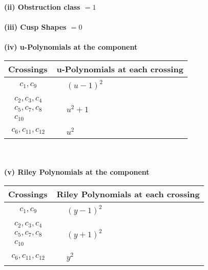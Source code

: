 \documentclass[1p]{elsarticle_modified}
\theoremstyle{definition}
\begin{document}
\flushleft \textbf{(ii) Obstruction class $= 1$}\\~\\
\flushleft \textbf{(iii) Cusp Shapes $= 0$}\\~\\
\newpage\renewcommand{\arraystretch}{1}
\flushleft \textbf{(iv) u-Polynomials at the component}\newline \\
\begin{tabular}{m{50pt}|m{274pt}}
Crossings & \hspace{64pt}u-Polynomials at each crossing \\
\hline $$\begin{aligned}c_{1},c_{9}\end{aligned}$$&$\begin{aligned}
&(u-1)^2
\end{aligned}$\\
\hline $$\begin{aligned}c_{2},c_{3},c_{4}\\c_{5},c_{7},c_{8}\\c_{10}\end{aligned}$$&$\begin{aligned}
&u^2+1
\end{aligned}$\\
\hline $$\begin{aligned}c_{6},c_{11},c_{12}\end{aligned}$$&$\begin{aligned}
&u^2
\end{aligned}$\\
\hline
\end{tabular}\\~\\
\newpage\renewcommand{\arraystretch}{1}
\flushleft \textbf{(v) Riley Polynomials at the component}\newline \\
\begin{tabular}{m{50pt}|m{274pt}}
Crossings & \hspace{64pt}Riley Polynomials at each crossing \\
\hline $$\begin{aligned}c_{1},c_{9}\end{aligned}$$&$\begin{aligned}
&(y-1)^2
\end{aligned}$\\
\hline $$\begin{aligned}c_{2},c_{3},c_{4}\\c_{5},c_{7},c_{8}\\c_{10}\end{aligned}$$&$\begin{aligned}
&(y+1)^2
\end{aligned}$\\
\hline $$\begin{aligned}c_{6},c_{11},c_{12}\end{aligned}$$&$\begin{aligned}
&y^2
\end{aligned}$\\
\hline
\end{tabular}\\~\\
\end{document}
